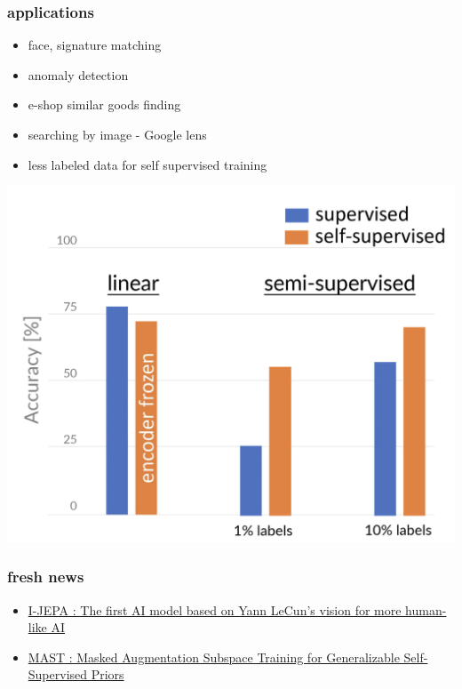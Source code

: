 \documentclass{beamer}
\begin{document}
\begin{frame}
  \frametitle{applications}

  \begin{itemize}
    \item face, signature matching
    \item anomaly detection
    \item e-shop similar goods finding
    \item searching by image - Google lens
    \item less labeled data for self supervised training
  \end{itemize}

  \centering
  \includegraphics[scale=0.3]{../images/self_supervised_comparison.png}
     
\end{frame}


\begin{frame}
  \frametitle{fresh news}

  \begin{itemize}
    \item \href{https://ai.meta.com/blog/yann-lecun-ai-model-i-jepa/}{I-JEPA : The first AI model based on Yann LeCun's vision for more human-like AI}   
    \item \href{https://arxiv.org/abs/2303.03679}{MAST : Masked Augmentation Subspace Training for Generalizable Self-Supervised Priors}
  \end{itemize}
   
\end{frame}
\end{document}
